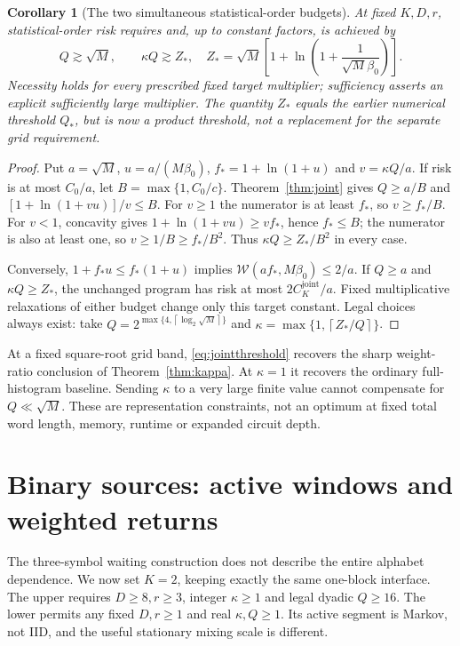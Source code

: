 \documentclass[11pt,letterpaper]{article}
\newtheorem{corollary}[theorem]{Corollary}
\theoremstyle{definition}\newtheorem{definition}[theorem]{Definition}
\theoremstyle{remark}\newtheorem{remark}[theorem]{Remark}
\newcommand{\ceil}[1]{\left\lceil #1\right\rceil}
\newcommand{\betaz}{\beta_0}
\begin{document}
\begin{corollary}[The two simultaneous statistical-order budgets]\label{cor:jointthreshold}
At fixed $K,D,r$, statistical-order risk requires and, up to constant factors, is achieved by
\begin{equation}\label{eq:jointthreshold}
 Q\gtrsim\sqrt M,\qquad
 \kappa Q\gtrsim Z_*,
 \quad
 Z_*=\sqrt M\left[1+\ln\left(1+\frac1{\sqrt M\betaz}\right)\right].
\end{equation}
Necessity holds for every prescribed fixed target multiplier; sufficiency asserts an explicit sufficiently large multiplier. The quantity $Z_*$ equals the earlier numerical threshold $Q_*$, but is now a \emph{product} threshold, not a replacement for the separate grid requirement.
\end{corollary}
\begin{proof}
Put $a=\sqrt M$, $u=a/(M\betaz)$, $f_*=1+\ln(1+u)$ and $v=\kappa Q/a$. If risk is at most $C_0/a$, let $B=\max\{1,C_0/c\}$. Theorem~\ref{thm:joint} gives $Q\ge a/B$ and
$[1+\ln(1+vu)]/v\le B$.
For $v\ge1$ the numerator is at least $f_*$, so $v\ge f_*/B$.
For $v<1$, concavity gives $1+\ln(1+vu)\ge vf_*$, hence $f_*\le B$; the numerator is also at least one, so $v\ge1/B\ge f_*/B^2$. Thus $\kappa Q\ge Z_*/B^2$ in every case.

Conversely, $1+f_*u\le f_*(1+u)$ implies
$\mathcal W(af_*,M\betaz)\le2/a$.
If $Q\ge a$ and $\kappa Q\ge Z_*$, the unchanged program has risk at most $2C_K^{\mathrm{joint}}/a$. Fixed multiplicative relaxations of either budget change only this target constant. Legal choices always exist: take
$Q=2^{\max\{4,\ceil{\log_2\sqrt M}\}}$ and
$\kappa=\max\{1,\ceil{Z_*/Q}\}$.
\end{proof}

At a fixed square-root grid band, \eqref{eq:jointthreshold} recovers the sharp weight-ratio conclusion of Theorem~\ref{thm:kappa}. At $\kappa=1$ it recovers the ordinary full-histogram baseline. Sending $\kappa$ to a very large finite value cannot compensate for $Q\ll\sqrt M$. These are representation constraints, not an optimum at fixed total word length, memory, runtime or expanded circuit depth.

\section{Binary sources: active windows and weighted returns}\label{sec:binary}
The three-symbol waiting construction does not describe the entire alphabet dependence. We now set $K=2$, keeping exactly the same one-block interface. The upper requires $D\ge8,r\ge3$, integer $\kappa\ge1$ and legal dyadic $Q\ge16$. The lower permits any fixed $D,r\ge1$ and real $\kappa,Q\ge1$. Its active segment is Markov, not IID, and the useful stationary mixing scale is different.
\end{document}
